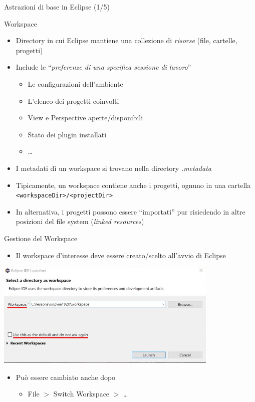 \documentclass[presentation]{beamer}
\begin{document}
\begin{frame}{Astrazioni di base in Eclipse (1/5)}
\begin{block}{Workspace}
\begin{itemize}
\item Directory in cui Eclipse mantiene una collezione di \emph{risorse} (file, cartelle, progetti)
\item Include le ``\emph{preferenze di una specifica sessione di lavoro}''
\begin{itemize}
\item Le configurazioni dell'ambiente
\item L'elenco dei progetti coinvolti
\item View e Perspective aperte/disponibili
\item Stato dei plugin installati
\item \dots
\end{itemize}
\item I metadati di un workspace si trovano nella directory \emph{.metadata}
\item Tipicamente, un workspace contiene anche i progetti, ognuno in una cartella \texttt{<workspaceDir>/<projectDir>}
\item In alternativa, i progetti possono essere ``importati'' pur risiedendo in altre posizioni del file system (\emph{linked resources})
\end{itemize}
\end{block}
\end{frame}

\begin{frame}{Gestione del Workspace}
\begin{itemize}
\item Il workspace d'interesse deve essere creato/scelto all'avvio di Eclipse
\end{itemize}
\begin{center}
\includegraphics[width=0.8\textwidth]{img/eclipse-screenshots/eclipse-ide-00.png}
\end{center}
\begin{itemize}
\item Può essere cambiato anche dopo
\begin{itemize}
\item File $>$ Switch Workspace $>$ \dots
\end{itemize}
\end{itemize}
\end{frame}
\end{document}
